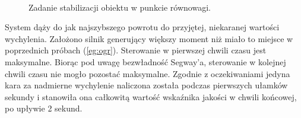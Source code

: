 \begin{figure}[H]
	~~
	\caption{Zadanie stabilizacji obiektu w punkcie równowagi.}
	\label{fig:equPen}
\end{figure}
System dąży do jak najszybszego powrotu do przyjętej, niekaranej wartości wychylenia. Założono silnik generujący większy moment niż miało to miejsce w poprzednich próbach (\ref{eg:ogr}). Sterowanie w pierwszej chwili czasu jest maksymalne. Biorąc pod uwagę bezwładność Segway'a, sterowanie w kolejnej chwili czasu nie mogło pozostać maksymalne. Zgodnie z oczekiwaniami jedyna kara za nadmierne wychylenie naliczona została podczas pierwszych ułamków sekundy i stanowiła ona całkowitą wartość wskaźnika jakości w chwili końcowej, po upływie 2 sekund.